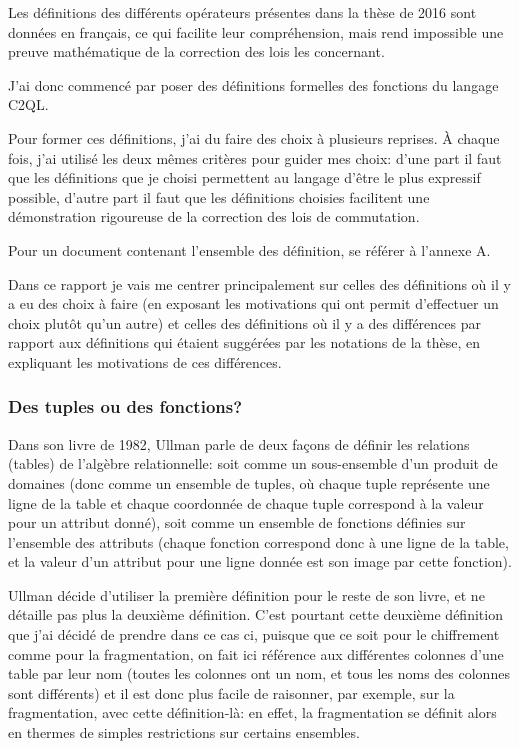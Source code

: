 Les définitions des différents opérateurs présentes dans la thèse de 2016
sont données en français, ce qui facilite leur compréhension, mais rend
impossible une preuve mathématique de la correction des lois les concernant.

J'ai donc commencé par poser des définitions formelles des fonctions du langage
C2QL.

Pour former ces définitions, j'ai du faire des choix à plusieurs reprises.
À chaque fois, j'ai utilisé les deux mêmes critères pour guider mes choix:
d'une part il faut que les définitions que je choisi permettent au langage
d'être le plus expressif possible, d'autre part il faut que les définitions
choisies facilitent une démonstration rigoureuse de la correction
des lois de commutation.

Pour un document contenant l'ensemble des définition,
se référer à l'annexe A.

Dans ce rapport je vais me centrer principalement
sur celles des définitions où il y a eu des choix à faire
(en exposant les motivations qui ont permit d'effectuer un choix
plutôt qu'un autre) et celles des définitions où il y a des différences par rapport
aux définitions qui étaient suggérées par les notations de la thèse,
en expliquant les motivations de ces différences.

\subsubsection*{Des tuples ou des fonctions?}
Dans son livre de 1982, Ullman parle de deux
façons de définir les relations (tables) de l'algèbre relationnelle:
soit comme un sous-ensemble d'un produit de domaines
(donc comme un ensemble de tuples, où chaque
tuple représente une ligne
de la table et chaque coordonnée de chaque tuple correspond
à la valeur pour un attribut donné), soit comme un ensemble de fonctions
définies sur l'ensemble des attributs (chaque fonction correspond donc
à une ligne de la table, et la valeur d'un attribut pour une ligne donnée
est son image par cette fonction).

Ullman décide d'utiliser la première définition pour le reste de son livre,
et ne détaille pas plus la deuxième définition. C'est pourtant cette deuxième
définition que j'ai décidé de prendre dans ce cas ci, puisque que ce soit
pour le chiffrement comme pour la fragmentation, on fait ici référence aux différentes
colonnes d'une table par leur nom (toutes les colonnes ont un nom, et tous les
noms des colonnes sont différents) et il est donc plus facile de raisonner,
par exemple, sur la fragmentation, avec cette définition-là:
en effet, la fragmentation se définit alors en thermes de simples restrictions
sur certains ensembles.

